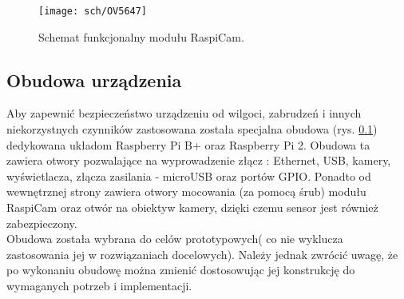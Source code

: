 \begin{figure}[bth]
\centering
{\texttt{[image: sch/OV5647]}}
\caption[Schemat funkcjonalny modułu RaspiCam.]{Schemat funkcjonalny modułu RaspiCam.}
\label{fig:detObj}
\end{figure} 

\subsection{Obudowa urządzenia}
Aby zapewnić bezpieczeństwo urządzeniu od wilgoci, zabrudzeń i innych niekorzystnych czynników zastosowana została specjalna obudowa (rys. \ref{}) dedykowana układom Raspberry Pi B+ oraz Raspberry Pi 2. 
Obudowa ta zawiera otwory pozwalające na wyprowadzenie złącz : Ethernet, USB, kamery, wyświetlacza, złącza zasilania - microUSB oraz portów GPIO. Ponadto od wewnętrznej strony zawiera otwory mocowania (za pomocą śrub) modułu RaspiCam oraz otwór na obiektyw kamery, dzięki czemu sensor jest również zabezpieczony.\\
Obudowa została wybrana do celów prototypowych( co nie wyklucza zastosowania jej w rozwiązaniach docelowych). Należy jednak zwrócić uwagę, że po wykonaniu obudowę można zmienić dostosowując jej konstrukcję do wymaganych potrzeb i implementacji. 
